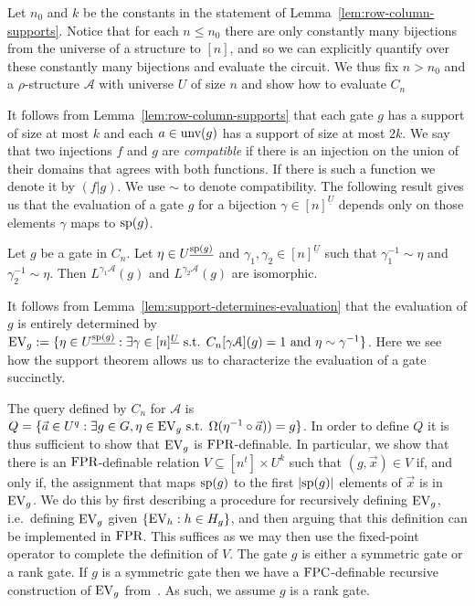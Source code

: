 \documentclass[a4paper,UKenglish]{lipics-v2018}
\begin{document}

Let $n_0$ and $k$ be the constants in the statement of
Lemma~\ref{lem:row-column-supports}. Notice that for each $n \leq n_0$ there are
only constantly many bijections from the universe of a structure to $[n]$, and
so we can explicitly quantify over these constantly many bijections and evaluate
the circuit. We thus fix $n > n_0$ and a $\rho$-structure $\mathcal{A}$ with
universe $U$ of size $n$ and show how to evaluate $C_n$

It follows from Lemma~\ref{lem:row-column-supports} that each gate $g$ has a
support of size at most $k$ and each $a \in \text{unv}(g)$ has a support of size
at most $2k$. We say that two injections $f$ and $g$ are \emph{compatible} if
there is an injection on the union of their domains that agrees with both
functions. If there is such a function we denote it by $(f \vert g)$.
We use $\sim$ to denote compatibility. The following result gives us that the
evaluation of a gate $g$ for a bijection $\gamma \in [n]^{\underline{U}}$
depends only on those elements $\gamma$ maps to $\text{sp}(g)$.

\begin{lemma}
	Let $g$ be a gate in $C_n$. Let $\eta \in U^{\underline{\text{sp}(g)}}$ and
  $\gamma_1, \gamma_2 \in [n]^{\underline{U}}$ such that $\gamma^{-1}_1 \sim
  \eta$ and $\gamma^{-1}_2 \sim \eta$. Then $L^{\gamma_1 \mathcal{A}}(g)$ and
  $L^{\gamma_2 \mathcal{A}}(g)$ are isomorphic.
	\label{lem:support-determines-evaluation}
\end{lemma}

It follows from Lemma~\ref{lem:support-determines-evaluation} that the
evaluation of $g$ is entirely determined by $\text{EV}_g := \{ \eta \in
U^{\underline{\text{sp}(g)}} : \exists \gamma \in [n]^{\underline{U}}\text{ s.t. }
C_n[\gamma \mathcal{A}](g) = 1 \text{ and } \eta \sim \gamma^{-1}\}$. Here we
see how the support theorem allows us to characterize the evaluation of a gate
succinctly.

The query defined by $C_n$ for $\mathcal{A}$ is $Q = \{ \vec{a} \in U^{q} :
\exists g \in G , \eta \in \text{EV}_g \text{ s.t. } \Omega(\eta^{-1}\circ \vec{a})) =
g\}$. In order to define $Q$ it is thus sufficient to show that $\text{EV}_g$ is
$\text{\upshape FPR}$-definable. In particular, we show that there is an $\text{\upshape FPR}$-definable
relation $V \subseteq [n^t] \times U^k$ such that $(g, \vec{x}) \in V$ if, and
only if, the assignment that maps $\text{sp}(g)$ to the first $\vert \text{sp}(g)
\vert$ elements of $\vec{x}$ is in $\text{EV}_g$. We do this by first describing a
procedure for recursively defining $\text{EV}_g$, i.e.\ defining $\text{EV}_g$ given
$\{\text{EV}_h : h \in H_g \}$, and then arguing that this definition can be
implemented in $\text{\upshape FPR}$. This suffices as we may then use the fixed-point operator
to complete the definition of $V$. The gate $g$ is either a symmetric gate or a
rank gate. If $g$ is a symmetric gate then we have a $\text{\upshape FPC}$-definable recursive
construction of $\text{EV}_g$ from~\cite{AndersonD17}. As such, we assume $g$ is a
rank gate.
\end{document}
